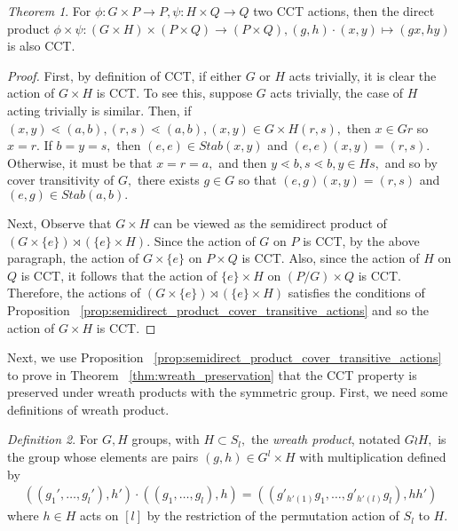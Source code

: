 \documentclass[10 pt]{amsart}
\theoremstyle{plain}
\theoremstyle{definition}
\theoremstyle{remark}
\numberwithin{equation}{section}
\newtheorem{thm}{Theorem}[section]
\theoremstyle{remark}
\newtheorem{defn}[thm]{Definition}
\begin{document}
\begin{thm}
\label{thm:direct_product_preservation}
For $\phi:G\times P\rightarrow P,\psi:H \times Q \rightarrow Q$ two CCT actions, then the direct product $\phi \times \psi:(G\times H)\times (P\times Q) \rightarrow (P\times Q),(g,h)\cdot (x,y) \mapsto (gx,hy)$ is also CCT.
\end{thm}
\begin{proof}
First, by definition of CCT, if either $G$ or $H$ acts trivially, it is clear the action of $G\times H$ is CCT. To see this, suppose $G$ acts trivially, the case of $H$ acting trivially is similar. Then, if $(x,y) \lessdot (a,b),(r,s)\lessdot (a,b),(x,y) \in G\times H(r,s),$ then $x \in Gr$ so $x = r.$ If $b = y = s,$ then $(e,e) \in Stab(x,y)$ and $(e,e)(x,y) = (r,s).$ Otherwise, it must be that $x = r = a,$ and then $y \lessdot b,s \lessdot b,y \in Hs,$ and so by cover transitivity of $G,$ there exists $g \in G$ so that $(e,g)(x,y) = (r,s)$ and $(e,g) \in Stab(a,b).$

Next, Observe that $G \times H$ can be viewed as the semidirect product of $(G\times \{e\}) \rtimes (\{e\} \times H).$ Since the action of $G$ on $P$ is CCT, by the above paragraph, the action of $G\times \{e\}$ on $P \times Q$ is CCT. Also, since the action of $H$ on $Q$ is CCT, it follows that the action of $\{e\}\times H$ on $(P/G) \times Q$ is CCT. Therefore, the actions of $(G\times \{e\}) \rtimes (\{e\} \times H)$ satisfies the conditions of Proposition ~\ref{prop:semidirect_product_cover_transitive_actions} and so the action of $G\times H$ is CCT.
\end{proof}

Next, we use Proposition ~\ref{prop:semidirect_product_cover_transitive_actions} to prove in Theorem ~\ref{thm:wreath_preservation} that the CCT property is preserved under wreath products with the symmetric group. First, we need some definitions of wreath product.

\begin{defn}
For $G, H$ groups, with $H \subset S_l,$ the {\it wreath product}, notated $G \wr H,$ is the group whose elements are pairs $(g,h) \in G^l\times H$ with multiplication defined by
\begin{align*}
((g_1',\ldots, g_l'),h') \cdot ((g_1,\ldots, g_l) ,h) =((g'_{h'(1)}g_1,\ldots, g'_{h'(l)}g_l),hh')
\end{align*}
where $h \in H$ acts on $[l]$ by the restriction of the permutation action of $S_l$ to $H.$
\end{defn}
\end{document}
